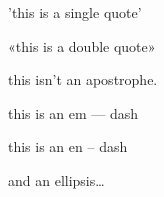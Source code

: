 
\def\mytitle{MultiMarkdown French Test}


'this is a single quote'

«this is a double quote»

this isn't an apostrophe.

this is an em --- dash

this is an en -- dash

and an ellipsis{\ldots}




